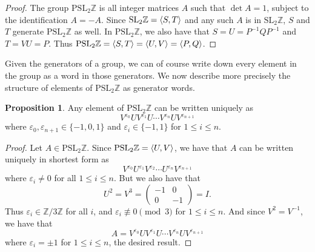 \documentclass[12pt,twoside]{reedthesis}
\theoremstyle{definition}
\newtheorem{prop}[thm]{Proposition}
\newcommand{\Z}{\mathbb{Z}}
\newcommand{\SLZ}{\mathrm{SL}_2{\Z}}
\newcommand{\PSLZ}{\mathrm{PSL}_2{\Z}}
\DeclarePairedDelimiter\ang{\langle}{\rangle}
\begin{document}
\begin{proof}
  The group $\PSLZ$ is all integer matrices $A$ such that $\det A = 1$, subject to the identification $A = -A$.
  Since $\SLZ = \ang{S,T}$ and any such $A$ is in $\SLZ$, $S$ and $T$ generate $\PSLZ$ as well.
  In $\PSLZ$, we also have that $S = U = P^{-1}QP^{-1}$ and $T = VU = P$.
  Thus $\PSLZ = \ang{S,T} = \ang{U,V} = \ang{P,Q}$.
\end{proof}

Given the generators of a group, we can of course write down every element in the group as a word in those generators. We now describe more precisely the structure of elements of $\PSLZ$ as generator words.

\begin{prop}\label{prop:reducedform}
  Any element of $\PSLZ$ can be written uniquely as
  \begin{equation}
    V^{\varepsilon_0} U V^{\varepsilon_1} U \cdots V^{\varepsilon_{n}} U V^{\varepsilon_{n+1}}
  \end{equation}
  where $\varepsilon_0, \varepsilon_{n+1} \in \{-1,0,1\}$ and $\varepsilon_i \in \{-1,1\}$ for $1 \leq i \leq n$.
\end{prop}

\begin{proof}
  Let $A \in \PSLZ$.
  Since $\PSLZ = \ang{U,V}$, we have that $A$ can be written uniquely in shortest form as
  \begin{equation*}
    V^{\varepsilon_0} U^{\varepsilon_1} V^{\varepsilon_2} \cdots U^{\varepsilon_{n}} V^{\varepsilon_{n+1}}
  \end{equation*}
  where $\varepsilon_i \neq 0$ for all $ 1 \leq i \leq n$.
  But we also have that
  \begin{equation*}
    U^2 = V^3 = \begin{pmatrix}
      -1 & 0 \\
      0 & -1
    \end{pmatrix}
    = I.
  \end{equation*}
  Thus $\varepsilon_i \in \Z / 3 \Z$ for all $i$, and $\varepsilon_i \not\equiv 0 \pmod 3$ for $1 \leq i \leq n$.
  And since $V^2 = V^{-1}$, we have that
  \begin{equation*}
    A = V^{\varepsilon_0} U V^{\varepsilon_1} U \cdots V^{\varepsilon_n} U V^{\varepsilon_{n+1}}
  \end{equation*}
  where $\varepsilon_i = \pm 1$ for $1 \leq i \leq n$, the desired result.
\end{proof}
\end{document}
